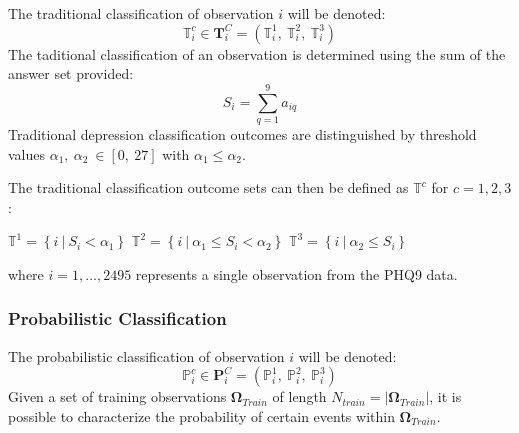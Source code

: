\documentclass[12pt,]{article}
\begin{document}
The traditional classification of observation \(i\) will be denoted:
\[\mathbb{T}_{i}^{c} \in \mathbf{T}_{i}^{C}=\left(\mathbb{T}_{i}^{1}, \ \mathbb{T}_{i}^{2}, \ \mathbb{T}_{i}^{3} \right)\]
The taditional classification of an observation is determined using the
sum of the answer set provided: \[S_{i} = \sum_{q=1}^{9} a_{iq}\]
Traditional depression classification outcomes are distinguished by
threshold values
\newline \(\alpha_{1}, \ \alpha_{2} \ \in \left [0, \ 27 \right ]\) with
\(\alpha_{1} \leq \alpha_{2}\).

The traditional classification outcome sets can then be defined as
\(\mathbb{T}^{c}\) for \(c=1,2,3\):

\begin{center}
$\mathbb{T}^{1}=\left \{i \ \Big | \ S_{i} < \alpha_{1}  \right \}$ \hspace{5pt} $\mathbb{T}^{2}=\left \{i \ \Big | \ \alpha_{1} \leq S_{i} < \alpha_{2}  \right \}$ \hspace{5pt} $\mathbb{T}^{3}=\left \{i \ \Big | \ \alpha_{2} \leq S_{i}  \right \}$
\end{center}

where \(i=1,\ldots, 2495\) represents a single observation from the PHQ9
data.

\hypertarget{probabilistic-classification}{%
\subsubsection{Probabilistic
Classification}\label{probabilistic-classification}}

The probabilistic classification of observation \(i\) will be denoted:
\[\mathbb{P}_{i}^{c} \in \mathbf{P}_{i}^{C}=(\mathbb{P}_{i}^{1}, \ \mathbb{P}_{i}^{2}, \ \mathbb{P}_{i}^{3})\]
Given a set of training observations \(\mathbf{\Omega}_{Train}\) of
length \(N_{train}=|\mathbf{\Omega}_{Train}|\), it is possible to
characterize the probability of certain events within
\(\mathbf{\Omega}_{Train}\).
\end{document}
